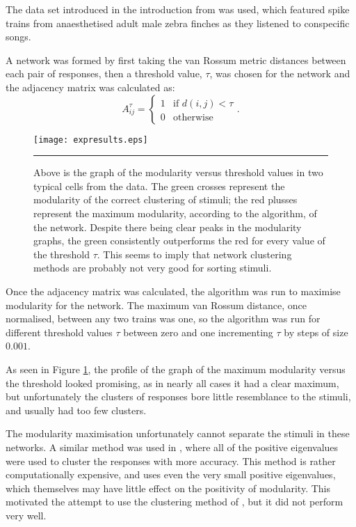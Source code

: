 The data set introduced in the introduction from \citep{NarayanEtAl2006b} was used, which featured spike trains 
from anaesthetised adult male zebra finches as they listened to conspecific 
songs.

A network was formed by first taking the van Rossum metric distances between 
each pair of responses, then a threshold value, $\tau$, was chosen for the network 
and the adjacency matrix was calculated as:
\begin{equation}
A^{\tau}_{ij} = \left\{ \begin{array}{ll} 1 & \mbox{if }d(i,j)<\tau \\
0 & \mbox{otherwise}
\end{array}\right. .
\end{equation}

\begin{figure}[h!tb]
  \centering
  \texttt{[image: expresults.eps]}
  \rule{33em}{0.5pt}
  \caption{Above is the graph of the modularity versus threshold values
    in two typical cells from the data.  The green crosses represent the 
    modularity of the correct clustering of stimuli; the red plusses represent 
    the maximum modularity, according to the algorithm, of the network.
    Despite there being clear peaks in the modularity graphs, the green 
    consistently outperforms the red for every value of the threshold $\tau$.  
    This seems to imply that network clustering methods are probably not very 
    good for sorting stimuli.  \label{graphs}}
\end{figure}

Once the adjacency matrix was calculated, the algorithm was run to 
maximise modularity for the network.  The maximum van Rossum 
distance, once normalised, between any two trains was one, so the algorithm was run for different 
threshold values $\tau$ between zero and one incrementing $\tau$ by steps of 
size $0.001$.

As seen in Figure \ref{graphs}, the profile of the graph of the maximum 
modularity versus the threshold looked promising, as in nearly all cases it had 
a clear maximum, but unfortunately the clusters of responses bore little 
resemblance to the stimuli, and usually had too few clusters.


The modularity maximisation unfortunately cannot separate the stimuli in these networks. A similar method was used in \citep{Humphries2011a}, where all of the positive eigenvalues were used to 
cluster the responses with more accuracy. This method is 
rather computationally expensive, and uses even the very small positive 
eigenvalues, which themselves may have little effect on the positivity of modularity.  This motivated the attempt to use the clustering method of \citet{Newman2006b}, but it did not perform very well.

